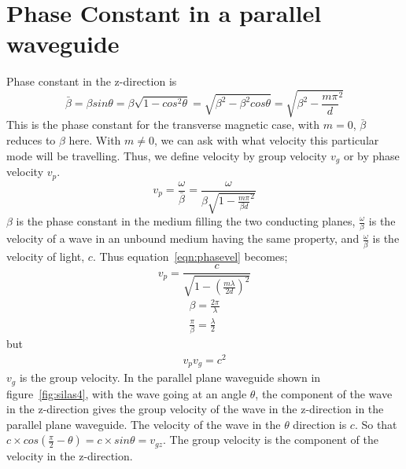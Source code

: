 \section{Phase Constant in a parallel waveguide}
Phase constant in the z-direction is
\begin{dmath*}
\bar{\beta} = \beta sin\theta = \beta \sqrt{1- cos^{2}\theta} =\sqrt{\beta^{2} -\beta^{2}cos\theta} = \sqrt{\beta^{2} -\frac{m\pi}{d}^{2}}
\end{dmath*}
This is the phase constant for the transverse magnetic case, with $m = 0$, $\bar{\beta}$ reduces to $\beta$ here. With $m\neq 0$, we can ask with what velocity this particular mode will be travelling. Thus, we define velocity by group velocity $v_{g}$ or by phase velocity $v_{p}$. 
\begin{dmath}
 v_{p}=\frac{\omega}{\bar{\beta}} =\frac{\omega}{\beta \sqrt{1- \frac{m \pi}{\beta d}^{2}}}
\label{eqn:phasevel}
\end{dmath}
$\beta$ is the phase constant in the medium filling the two conducting planes, $\frac{\omega}{\beta}$ is the velocity of a wave in an unbound medium having the same property, and $\frac{\omega}{\beta}$ is the velocity of light, $c$. Thus equation~\ref{eqn:phasevel} becomes;
\begin{equation*}
v_{p} =\frac{c}{\sqrt{1-(\frac{m\lambda}{2d})^{2}}}
\end{equation*}
\begin{align*}
\beta =\frac{2\pi}{\lambda}\\
\frac{\pi}{\beta} =\frac{\lambda}{2}
\end{align*}
but 
\begin{align}
v_{p} v_{g}= c^{2}
\label{eqn:grpvel}
\end{align}
$v_{g}$ is the group velocity. In the parallel plane waveguide shown in figure~\ref{fig:silas4}, with the wave going at an angle $\theta$, the component of the wave in the z-direction gives the group velocity of the wave in the z-direction in the parallel plane waveguide. The velocity of the wave in the $\theta$ direction is $c$. So that $c\times cos(\frac{\pi}{2} - \theta)= c\times sin\theta= v_{gz}$. The group velocity is the component of the velocity in the z-direction.

